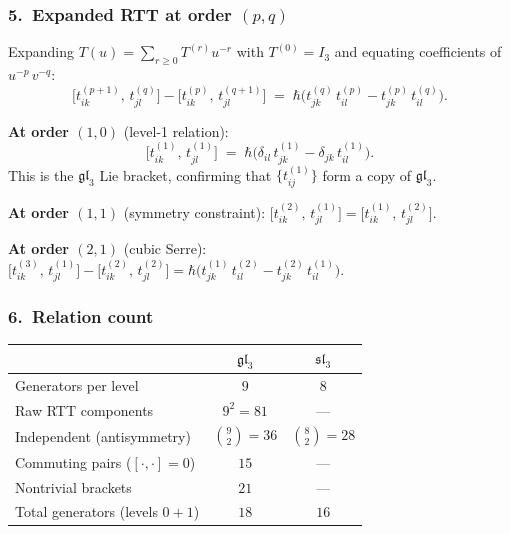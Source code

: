 \subsubsection*{5.\ Expanded RTT at order $(p,q)$}

Expanding $T(u) = \sum_{r \ge 0} T^{(r)} u^{-r}$ with $T^{(0)} = I_3$
and equating coefficients of $u^{-p}\,v^{-q}$:
\begin{equation}\label{eq:rtt-pq}
\bigl[t^{(p+1)}_{ik},\, t^{(q)}_{jl}\bigr]
- \bigl[t^{(p)}_{ik},\, t^{(q+1)}_{jl}\bigr]
\;=\;
\hbar\bigl(t^{(q)}_{jk}\,t^{(p)}_{il}
  - t^{(p)}_{jk}\,t^{(q)}_{il}\bigr).
\end{equation}

\noindent\textbf{At order $(1,0)$} (level-1 relation):
\begin{equation}\label{eq:level-1-sl3}
\bigl[t^{(1)}_{ik},\, t^{(1)}_{jl}\bigr]
\;=\;
\hbar\bigl(\delta_{il}\,t^{(1)}_{jk}
  - \delta_{jk}\,t^{(1)}_{il}\bigr).
\end{equation}
This is the $\mathfrak{gl}_3$ Lie bracket, confirming that
$\{t^{(1)}_{ij}\}$ form a copy of $\mathfrak{gl}_3$.

\noindent\textbf{At order $(1,1)$} (symmetry constraint):
$\bigl[t^{(2)}_{ik},\, t^{(1)}_{jl}\bigr]
= \bigl[t^{(1)}_{ik},\, t^{(2)}_{jl}\bigr]$.

\noindent\textbf{At order $(2,1)$} (cubic Serre):
$\bigl[t^{(3)}_{ik},\, t^{(1)}_{jl}\bigr]
- \bigl[t^{(2)}_{ik},\, t^{(2)}_{jl}\bigr]
= \hbar\bigl(t^{(1)}_{jk}\,t^{(2)}_{il}
  - t^{(2)}_{jk}\,t^{(1)}_{il}\bigr)$.

\subsubsection*{6.\ Relation count}

\begin{center}
\begin{tabular}{lcc}
\hline
& $\mathfrak{gl}_3$ & $\mathfrak{sl}_3$ \\
\hline
Generators per level & $9$ & $8$ \\
Raw RTT components & $9^2 = 81$ & --- \\
Independent (antisymmetry) & $\binom{9}{2} = 36$ & $\binom{8}{2} = 28$ \\
\quad Commuting pairs ($[\cdot,\cdot]=0$) & $15$ & --- \\
\quad Nontrivial brackets & $21$ & --- \\
Total generators (levels $0{+}1$) & $18$ & $16$ \\
\hline
\end{tabular}
\end{center}

